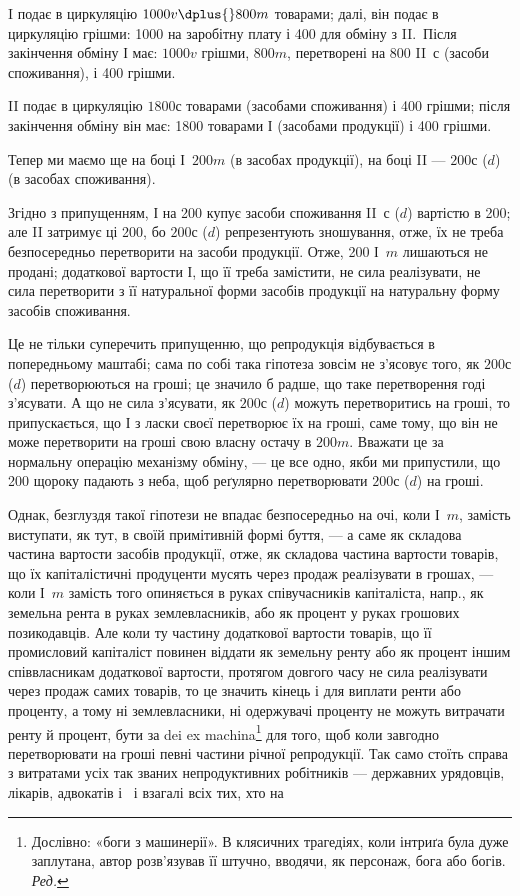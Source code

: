 
I подає в циркуляцію $1000 v \dplus{} 800 m$ товарами; далі, він подає
в циркуляцію грішми: 1000 на заробітну плату і 400
для обміну з II.~Після закінчення обміну І має: $1000 v$ грішми, $800 m$,
перетворені на 800 II~$с$ (засоби споживання), і 400 грішми.

II подає в циркуляцію $1800 с$ товарами (засобами споживання) і
400 грішми; після закінчення обміну він має: 1800 товарами І
(засобами продукції) і 400 грішми.

Тепер ми маємо ще на боці І~$200 m$ (в засобах продукції), на боці
II — $200 с$ ($d$) (в засобах споживання).

Згідно з припущенням, І на 200 купує засоби споживання
II~$с$ ($d$) вартістю в 200; але II затримує ці 200, бо $200 с$ ($d$)
репрезентують зношування, отже, їх не треба безпосередньо перетворити
на засоби продукції. Отже, 200 І~$m$ лишаються не продані;
 додаткової вартости І, що її треба замістити, не сила реалізувати, не
сила перетворити з її натуральної форми засобів продукції на натуральну
форму засобів споживання.

Це не тільки суперечить припущенню, що репродукція відбувається
в попередньому маштабі; сама по собі така гіпотеза зовсім не з’ясовує
того, як $200 с$ ($d$) перетворюються на гроші; це значило б радше, що
таке перетворення годі з’ясувати. А що не сила з’ясувати, як $200 с$ ($d$)
можуть перетворитись на гроші, то припускається, що І з ласки своєї
перетворює їх на гроші, саме тому, що він не може перетворити на гроші
свою власну остачу в $200 m$. Вважати це за нормальну операцію механізму
обміну, — це все одно, якби ми припустили, що 200
щороку падають з неба, щоб реґулярно перетворювати $200 с$ ($d$) на гроші.

Однак, безглуздя такої гіпотези не впадає безпосередньо на очі, коли І~$m$,
замість виступати, як тут, в своїй примітивній формі буття, — а саме як
складова частина вартости засобів продукції, отже, як складова частина
вартости товарів, що їх капіталістичні продуценти мусять через продаж
реалізувати в грошах, — коли І~$m$ замість того опиняється в руках співучасників
капіталіста, напр., як земельна рента в руках землевласників,
або як процент у руках грошових позикодавців. Але коли ту частину додаткової
вартости товарів, що її промисловий капіталіст повинен віддати
як земельну ренту або як процент іншим співвласникам додаткової вартости,
протягом довгого часу не сила реалізувати через продаж самих
товарів, то це значить кінець і для виплати ренти або проценту, а тому
ні землевласники, ні одержувачі проценту не можуть витрачати ренту й
процент, бути за dei ex machina\footnote*{
Дослівно: «боги з машинерії». В клясичних
трагедіях, коли інтриґа була дуже заплутана, автор розв’язував її штучно,
вводячи, як персонаж, бога або богів. \emph{Ред.}
} для того, щоб коли завгодно перетворювати
на гроші певні частини річної репродукції. Так само стоїть
справа з витратами усіх так званих непродуктивних робітників — державних
урядовців, лікарів, адвокатів і~ і взагалі всіх тих, хто на
\parbreak{}  %
